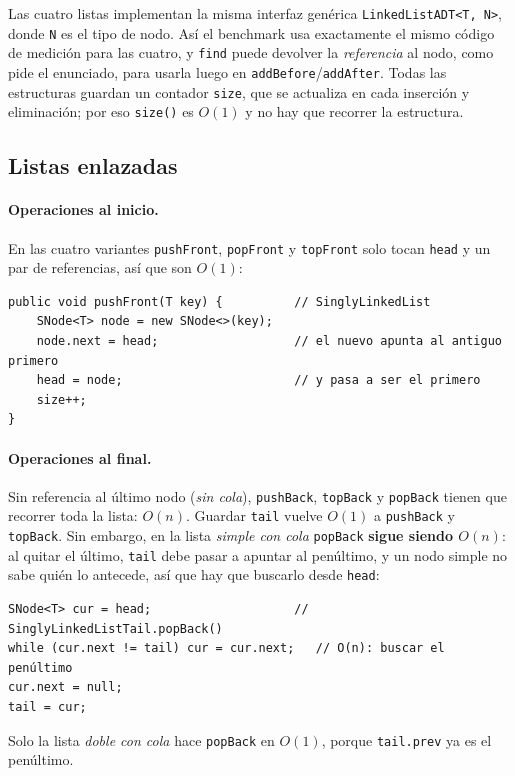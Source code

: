 \documentclass[11pt,a4paper]{article}
\newcommand{\Oone}{$O(1)$}
\newcommand{\On}{$O(n)$}
\begin{document}
Las cuatro listas implementan la misma interfaz genérica \texttt{LinkedListADT<T, N>}, donde \texttt{N}
es el tipo de nodo. Así el benchmark usa exactamente el mismo código de medición para las cuatro, y
\texttt{find} puede devolver la \emph{referencia} al nodo, como pide el enunciado, para usarla luego en
\texttt{addBefore}/\texttt{addAfter}. Todas las estructuras guardan un contador \texttt{size}, que se
actualiza en cada inserción y eliminación; por eso \texttt{size()} es \Oone{} y no hay que recorrer la estructura.

\subsection{Listas enlazadas}

\paragraph{Operaciones al inicio.} En las cuatro variantes \texttt{pushFront}, \texttt{popFront} y
\texttt{topFront} solo tocan \texttt{head} y un par de referencias, así que son \Oone:
\begin{lstlisting}
public void pushFront(T key) {          // SinglyLinkedList
    SNode<T> node = new SNode<>(key);
    node.next = head;                   // el nuevo apunta al antiguo primero
    head = node;                        // y pasa a ser el primero
    size++;
}
\end{lstlisting}

\paragraph{Operaciones al final.} Sin referencia al último nodo (\emph{sin cola}), \texttt{pushBack},
\texttt{topBack} y \texttt{popBack} tienen que recorrer toda la lista: \On. Guardar \texttt{tail} vuelve
\Oone{} a \texttt{pushBack} y \texttt{topBack}. Sin embargo, en la lista \emph{simple con cola}
\texttt{popBack} \textbf{sigue siendo \On}: al quitar el último, \texttt{tail} debe pasar a apuntar al
penúltimo, y un nodo simple no sabe quién lo antecede, así que hay que buscarlo desde \texttt{head}:
\begin{lstlisting}
SNode<T> cur = head;                    // SinglyLinkedListTail.popBack()
while (cur.next != tail) cur = cur.next;   // O(n): buscar el penúltimo
cur.next = null;
tail = cur;
\end{lstlisting}
Solo la lista \emph{doble con cola} hace \texttt{popBack} en \Oone, porque \texttt{tail.prev} ya es el penúltimo.
\end{document}
